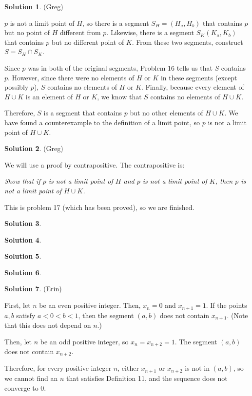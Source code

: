\documentclass{article}
\theoremstyle{definition}
\newtheorem{solution}{Solution}
\begin{document}
\begin{solution} %
(Greg)

$p$ is not a limit point of $H$, so there is a segment $S_H = (H_a, H_b)$ that contains $p$ but no point of $H$ different from $p$.
Likewise, there is a segment $S_K (K_a, K_b)$ that contains $p$ but no different point of $K$.
From these two segments, construct $S = S_H \cap S_K$. 

Since $p$ was in both of the original segments, Problem 16 tells us that $S$ contains $p$.
However, since there were no elements of $H$ or $K$ in these segments (except possibly $p$), $S$ contains no elements of $H$ or $K$.
Finally, because every element of $H \cup K$ is an element of $H$ or $K$, we know that $S$ contains no elements of $H \cup K$.

Therefore, $S$ is a segment that contains $p$ but no other elements of $H \cup K$.
We have found a counterexample to the definition of a limit point, so $p$ is not a limit point of $H \cup K$.
\end{solution}

\begin{solution} %
(Greg)

We will use a proof by contrapositive. The contrapositive is:

\textit{Show that if $p$ is not a limit point of $H$ and $p$ is not a limit point of $K$, then $p$ is not a limit point of $H \cup K$.}

This is problem 17 (which has been proved), so we are finished.
\end{solution}

\begin{solution} %
\end{solution}

\begin{solution} %
\end{solution}

\begin{solution} %
\end{solution}

\begin{solution} %
\end{solution}

\begin{solution} %
(Erin)

First, let $n$ be an even positive integer.
Then, $x_n = 0$ and $x_{n+1} = 1$.
If the points $a, b$ satisfy $a < 0 < b < 1$, then the segment $(a, b)$ does not contain $x_{n+1}$.
(Note that this does not depend on $n$.)

Then, let $n$ be an odd positive integer, so $x_n = x_{n+2} = 1$.
The segment $(a, b)$ does not contain $x_{n+2}$.

Therefore, for every positive integer $n$, either $x_{n+1}$ or $x_{n+2}$ is not in $(a, b)$, so we cannot find an $n$ that satisfies Definition 11, and the sequence does not converge to $0$.
\end{solution}
\end{document}
